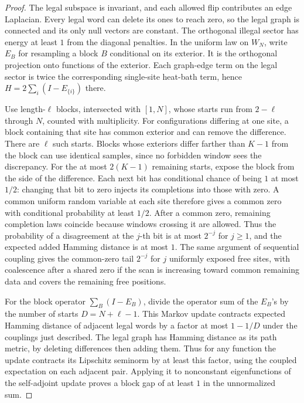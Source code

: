 \documentclass[11pt,reqno]{amsart}
\theoremstyle{definition}
\theoremstyle{remark}
\numberwithin{equation}{section}
\begin{document}
\begin{proof}
The legal subspace is invariant, and each allowed flip contributes an
edge Laplacian. Every legal word can delete its ones to reach
zero, so the legal graph is connected and its only null vectors
are constant. The orthogonal illegal sector has energy at
least \(1\) from the diagonal penalties. In the uniform law
on \(W_N\), write \(E_B\) for resampling a block \(B\)
conditional on its exterior. It is the orthogonal projection
onto functions of the exterior. Each graph-edge term on the
legal sector is twice the corresponding single-site heat-bath
term, hence \(H=2\sum_i (I-E_{\{i\}})\) there.

Use length-\(\ell\) blocks, intersected with \([1,N]\), whose
starts run from \(2-\ell\) through \(N\), counted with
multiplicity. For configurations differing at one site, a block
containing that site has common exterior and can remove the
difference. There are \(\ell\) such starts. Blocks whose
exteriors differ farther than \(K-1\) from the block can use
identical samples, since no forbidden window sees the discrepancy.
For the at most \(2(K-1)\) remaining starts, expose the block
from the side of the difference. Each next bit has conditional
chance of being \(1\) at most \(1/2\): changing that bit to
zero injects its completions into those with zero. A common
uniform random variable at each site therefore gives a common
zero with conditional probability at least \(1/2\).
After a common zero, remaining completion laws coincide
because windows crossing it are allowed. Thus the
probability of a disagreement at the \(j\)-th bit is at most
\(2^{-j}\) for \(j\ge1\), and the expected added Hamming
distance is at most \(1\). The same argument of sequential
coupling gives the common-zero tail \(2^{-j}\) for \(j\)
uniformly exposed free sites, with coalescence after a shared
zero if the scan is increasing toward common remaining data
and covers the remaining free positions.

For the block operator \(\sum_B(I-E_B)\), divide the operator
sum of the \(E_B\)'s by the number of starts \(D=N+\ell-1\).
This Markov update contracts expected Hamming distance of
adjacent legal words by a factor at most \(1-1/D\) under the
couplings just described. The legal graph has Hamming distance
as its path metric, by deleting differences then adding them.
Thus for any function the update contracts its Lipschitz
seminorm by at least this factor, using the coupled expectation
on each adjacent pair. Applying it to nonconstant eigenfunctions
of the self-adjoint update proves a block gap of at least \(1\)
in the unnormalized sum.


\end{proof}
\end{document}
